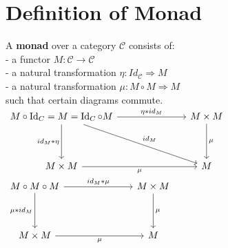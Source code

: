 \documentclass[a4paper, twoside, english, 11pt]{book}
\DeclareMathOperator{\Id}{Id}
\newcommand{\C}{\mathcal C}
\begin{document}
\section{Definition of Monad}

A \textbf{monad} over a category $\C$ consists of: \\

- a functor $M : \C \rightarrow \C$ \\

- a natural transformation $\eta : Id_\C \Rightarrow M$ \\

- a natural transformation $\mu : M \circ M \Rightarrow M$ \\

such that certain diagrams commute. \\

$\begin{tikzcd}
M \circ \Id_C = M = \Id_C \circ M \arrow[dd, "id_M * \eta"'] \arrow[rrr, "\eta * id_M"] \arrow[rrrdd, "id_M"] &  &  & M \times M \arrow[dd, "\mu"] \\
                                                                                                              &  &  &                              \\
M \times M \arrow[rrr, "\mu"']                                                                                &  &  & M
\end{tikzcd}$ \\

$\begin{tikzcd}
M \circ M \circ M \arrow[dd, "\mu * id_M"'] \arrow[rrr, "id_M * \mu"] &  &  & M \times M \arrow[dd, "\mu"] \\
                                                                      &  &  &                              \\
M \times M \arrow[rrr, "\mu"']                                        &  &  & M
\end{tikzcd}$
\end{document}
